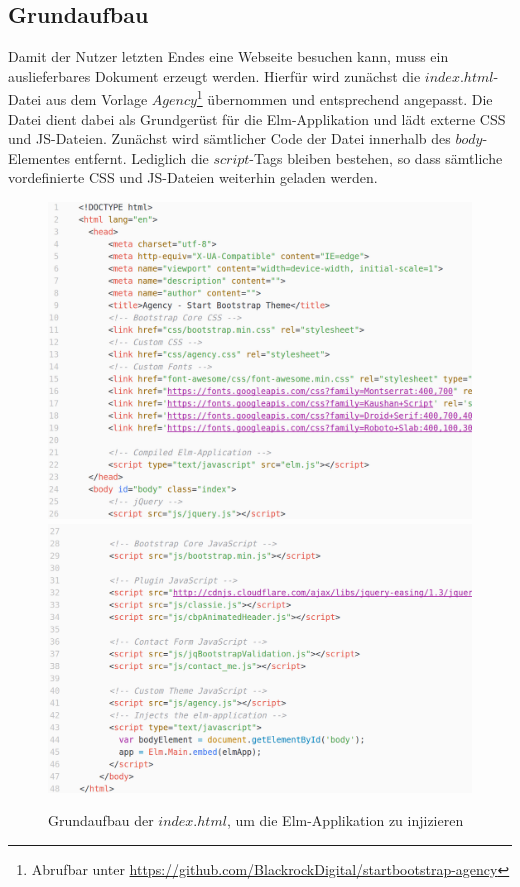 \subsection{Grundaufbau}
\label{sec:Grundaufbau}
Damit der Nutzer letzten Endes eine Webseite besuchen kann, muss ein auslieferbares Dokument erzeugt werden. Hierfür wird zunächst die $index.html$-Datei aus dem Vorlage $Agency$\footnote{Abrufbar unter \url{https://github.com/BlackrockDigital/startbootstrap-agency}} übernommen und entsprechend angepasst. Die Datei dient dabei als Grundgerüst für die Elm-Applikation und lädt externe \ac{CSS} und \ac{JS}-Dateien.
Zunächst wird sämtlicher Code der Datei innerhalb des $body$-Elementes entfernt. Lediglich die $script$-Tags bleiben bestehen, so dass sämtliche vordefinierte \ac{CSS} und \ac{JS}-Dateien weiterhin geladen werden.
\begin{figure}[p]
\centering
\includegraphics[scale=0.32]{img/index-grundaufbau-1.png}
\includegraphics[scale=0.32]{img/index-grundaufbau-2.png}
\caption{Grundaufbau der $index.html$, um die Elm-Applikation zu injizieren}\label{fig:index-grundaufbau}
\end{figure}


